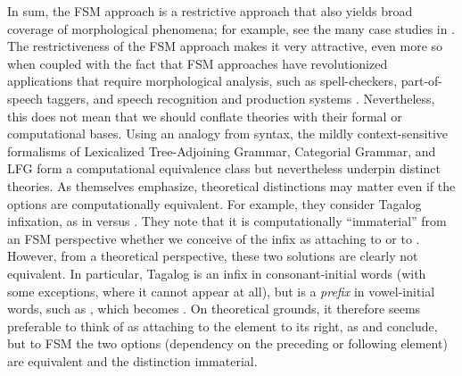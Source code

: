\documentclass[output=paper,hidelinks]{langscibook}
\begin{document}
  \begin{sloppypar}
    In sum, the FSM approach is a restrictive approach that also
    yields broad coverage of morphological phenomena; for example, see
    the many case studies in \citet{roark;sproat07}. The
    restrictiveness of the FSM approach makes it very attractive,
    even more so when coupled with the fact that FSM approaches
    have revolutionized applications that require morphological
    analysis, such as spell-checkers, part-of-speech taggers, and
    speech recognition and production systems 
    \citep{KaplanKay1994,beesleykarttunen03,roark;sproat07}. Nevertheless,
    this does not mean that we should conflate theories with their
    formal or computational bases. Using an analogy from syntax, the
    mildly context-sensitive formalisms of Lexicalized Tree-Adjoining
    Grammar, Categorial Grammar, and LFG form a computational
    equivalence class but nevertheless underpin distinct theories. As
    \citet{roark;sproat07} themselves emphasize, theoretical
    distinctions may matter even if the options are computationally
    equivalent. For example, they consider Tagalog 
    infixation, as in   versus
     . They note that it is
    computationally ``immaterial'' from an FSM perspective whether we
    conceive of the infix as attaching to  or to
     \citep[30--31]{roark;sproat07}. However, from a
    theoretical perspective, these two solutions are clearly not
    equivalent. In particular, Tagalog  is an infix in
    consonant-initial words (with some exceptions, where it cannot
    appear at all), but is a \emph{prefix} in vowel-initial words, such
    as , which becomes   \citep[204]{orgun;sprouse99}. On theoretical grounds, it
    therefore seems preferable to think of  as attaching to
    the element to its right, as \citet{McCarthyPrince1993} and
    \citet{orgun;sprouse99} conclude, but to FSM the two options
    (dependency on the preceding or following element) are equivalent
    and the distinction immaterial.
  \end{sloppypar}
  
\end{document}
